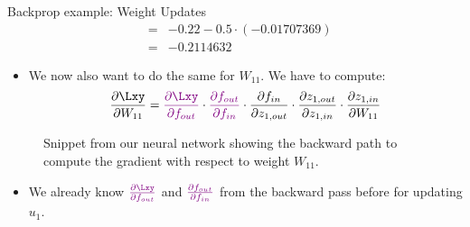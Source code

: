 \begin{vbframe}{Backprop example: Weight Updates}
\begin{eqnarray*}
                &=& -0.22 - 0.5 \cdot (\num[round-mode=places,round-precision=4]{-0.01707369}) \\
                &=& \num[round-mode=places,round-precision=4]{-0.2114632}
    \end{eqnarray*}
\framebreak
  \begin{itemize}
    \item We now also want to do the same for $W_{11}$. We have to compute: $$\frac{\partial \Lxy}{\partial W_{11}} = \textcolor{violet}{\frac{\partial \Lxy}{\partial f_{out}}} \cdot \textcolor{violet}{\frac{\partial f_{out}}{\partial f_{in}}} \cdot \frac{\partial f_{in}}{\partial z_{1,out}} \cdot \frac{\partial z_{1,out}}{\partial z_{1,in}} \cdot \frac{\partial z_{1,in}}{\partial W_{11}}$$
  \end{itemize}
  \begin{figure}
    \centering
      \caption{Snippet from our neural network showing the backward path to compute the gradient with respect to weight $W_{11}$.}
  \end{figure}
\framebreak
  \begin{itemize}
    \item We already know $\textcolor{violet}{\frac{\partial \Lxy}{\partial f_{out}}}$ and $\textcolor{violet}{\frac{\partial f_{out}}{\partial f_{in}}}$ from the backward pass before for updating $u_1$.
  \begin{figure}
    \centering

\end{figure}
\end{itemize}
\end{vbframe}
